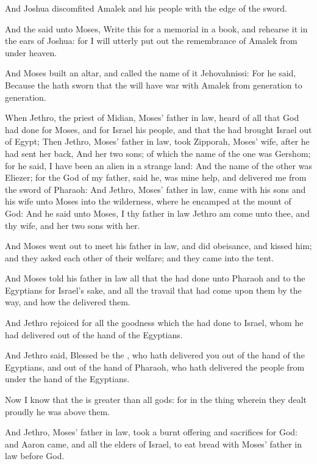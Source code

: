 \Verse And Joshua discomfited Amalek and his people with the edge of the sword.

\Verse And the \LORD said unto Moses, Write this for a memorial in a book, and rehearse it in the ears of Joshua: for I will utterly put out the remembrance of Amalek from under heaven.

\Verse And Moses built an altar, and called the name of it Jehovahnissi: \Verse For he said, Because the \LORD hath sworn that the \LORD will have war with Amalek from generation to generation.

\Chapter
\Verse When Jethro, the priest of Midian, Moses' father in law, heard of all that God had done for Moses, and for Israel his people, and that the \LORD had brought Israel out of Egypt; \Verse Then Jethro, Moses' father in law, took Zipporah, Moses' wife, after he had sent her back, \Verse And her two sons; of which the name of the one was Gershom; for he said, I have been an alien in a strange land: \Verse And the name of the other was Eliezer; for the God of my father, said he, was mine help, and delivered me from the sword of Pharaoh: \Verse And Jethro, Moses' father in law, came with his sons and his wife unto Moses into the wilderness, where he encamped at the mount of God: \Verse And he said unto Moses, I thy father in law Jethro am come unto thee, and thy wife, and her two sons with her.

\Verse And Moses went out to meet his father in law, and did obeisance, and kissed him; and they asked each other of their welfare; and they came into the tent.

\Verse And Moses told his father in law all that the \LORD had done unto Pharaoh and to the Egyptians for Israel's sake, and all the travail that had come upon them by the way, and how the \LORD delivered them.

\Verse And Jethro rejoiced for all the goodness which the \LORD had done to Israel, whom he had delivered out of the hand of the Egyptians.

\Verse And Jethro said, Blessed be the \LORD, who hath delivered you out of the hand of the Egyptians, and out of the hand of Pharaoh, who hath delivered the people from under the hand of the Egyptians.

\Verse Now I know that the \LORD is greater than all gods: for in the thing wherein they dealt proudly he was above them.

\Verse And Jethro, Moses' father in law, took a burnt offering and sacrifices for God: and Aaron came, and all the elders of Israel, to eat bread with Moses' father in law before God.

